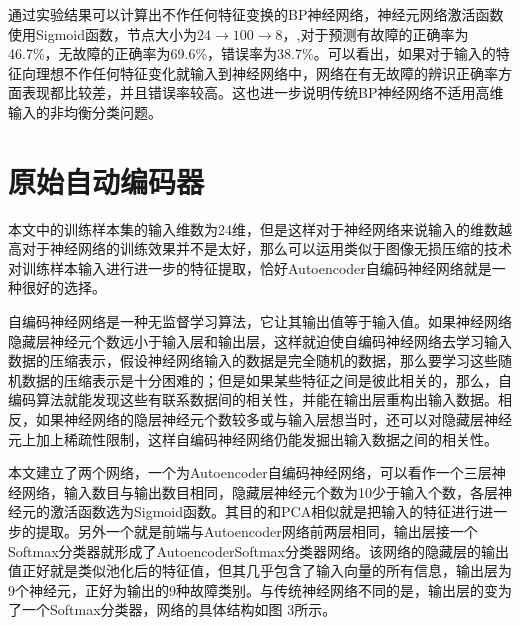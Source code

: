 \documentclass{ctacn}%
\begin{document}
\begin{multicols}{2}
通过实验结果可以计算出不作任何特征变换的BP神经网络，神经元网络激活函数使用Sigmoid函数，节点大小为$24\rightarrow100\rightarrow8$，,对于预测有故障的正确率为46.7\%，无故障的正确率为69.6\%，错误率为38.7\%。可以看出，如果对于输入的特征向理想不作任何特征变化就输入到神经网络中，网络在有无故障的辨识正确率方面表现都比较差，并且错误率较高。这也进一步说明传统BP神经网络不适用高维输入的非均衡分类问题。

\section{原始自动编码器}

本文中的训练样本集的输入维数为24维，但是这样对于神经网络来说输入的维数越高对于神经网络的训练效果并不是太好，那么可以运用类似于图像无损压缩的技术对训练样本输入进行进一步的特征提取，恰好Autoencoder自编码神经网络就是一种很好的选择。

自编码神经网络是一种无监督学习算法，它让其输出值等于输入值。如果神经网络隐藏层神经元个数远小于输入层和输出层，这样就迫使自编码神经网络去学习输入数据的压缩表示，假设神经网络输入的数据是完全随机的数据，那么要学习这些随机数据的压缩表示是十分困难的；但是如果某些特征之间是彼此相关的，那么，自编码算法就能发现这些有联系数据间的相关性，并能在输出层重构出输入数据。相反，如果神经网络的隐层神经元个数较多或与输入层想当时，还可以对隐藏层神经元上加上稀疏性限制，这样自编码神经网络仍能发掘出输入数据之间的相关性。

本文建立了两个网络，一个为Autoencoder自编码神经网络，可以看作一个三层神经网络，输入数目与输出数目相同，隐藏层神经元个数为10少于输入个数，各层神经元的激活函数选为Sigmoid函数。其目的和PCA相似就是把输入的特征进行进一步的提取。另外一个就是前端与Autoencoder网络前两层相同，输出层接一个Softmax分类器就形成了AutoencoderSoftmax分类器网络。该网络的隐藏层的输出值正好就是类似池化后的特征值，但其几乎包含了输入向量的所有信息，输出层为9个神经元，正好为输出的9种故障类别。与传统神经网络不同的是，输出层的变为了一个Softmax分类器，网络的具体结构如图
3所示。


\end{multicols}
\end{document}
